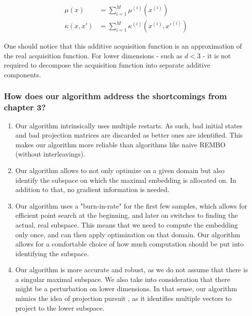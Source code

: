 
\begin{align}
\mu(x) &= \sum_{i=1}^{M} \mu^{(i)} ( x^{(i)} ) \\
\kappa(x, x') &= \sum_{i=1}^{M} \kappa^{(i)} ( x^{(i)}, x'^{(i)}  )
\end{align}

One should notice that this additive acquisition function is an approximation of the real acquisition function. 
For lower dimensions - such as $d<3$ - it is not required to decompose the acquisition function into separate additive components.

\subsubsection{How does our algorithm address the shortcomings from chapter 3?}

\begin{enumerate}
\item Our algorithm intrinsically uses multiple restarts.
As such, bad initial states and bad projection matrices are discarded as better ones are identified.
This makes our algorithm more reliable than algorithms like naive REMBO (without interleavings).
\item Our algorithm allows to not only optimize on a given domain but also identify the subspace on which the maximal embedding is allocated on.
In addition to that, no gradient information is needed.
\item Our algorithm uses a "burn-in-rate" for the first few samples, which allows for efficient point search at the beginning, and later on switches to finding the actual, real subspace.
This means that we need to compute the embedding only once, and can then apply optimization on that domain.
Our algorithm allows for a comfortable choice of how much computation should be put into identifying the subspace.
\item Our algorithm is more accurate and robust, as we do not assume that there is a singular maximal subspace. 
We also take into consideration that there might be a perturbation on lower dimensions.
In that sense, our algorithm mimics the idea of projection pursuit \citep{ProjectionPursuit}, as it identifies multiple vectors to project to the lower subspace.
\end{enumerate}


